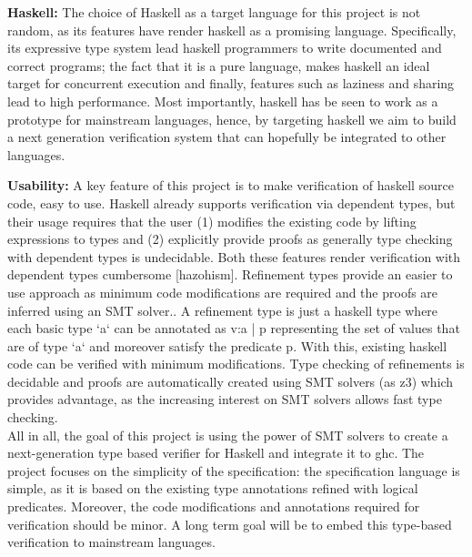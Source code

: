 \textbf{Haskell:}
The choice of Haskell as a target language for this project is not random, as its features have render haskell as a promising language.
Specifically, its expressive type system lead haskell programmers to write documented and  correct programs; the fact that it is a pure language, makes haskell an ideal target for concurrent execution and finally, features such as laziness and sharing lead to high performance. 
Most importantly, haskell has be seen to work as a prototype for mainstream languages,
hence, by targeting haskell we aim to build a next generation verification system that can hopefully be integrated to other languages.



\textbf{Usability:}
A key feature of this project is to make verification of haskell source code, easy to use.
Haskell already supports verification via dependent types, but their usage requires that the user
(1) modifies the existing code by lifting expressions to types
and (2) explicitly provide proofs as generally type checking with dependent types is undecidable.
Both these features render verification with dependent types cumbersome [hazohism].
%
Refinement types provide an easier to use approach as minimum code modifications are required 
and the proofs are inferred using an SMT solver..
%
A refinement type is just a haskell type where each basic type `a` can be annotated as 
{v:a | p} representing the set of values that are of type `a` and moreover satisfy the predicate p.
With this, existing haskell code can be verified with minimum modifications.
% 
Type checking of refinements is decidable and proofs are automatically created using SMT solvers (as z3) which provides advantage, as the increasing interest on SMT solvers allows fast type checking.
\\

All in all, the goal of this project is using the power of SMT solvers to 
create a next-generation type based verifier for Haskell and integrate it to ghc.
The project focuses on the simplicity of the specification:
the specification language is simple, as it is based on the existing type annotations
refined with logical predicates.
Moreover, the code modifications and annotations required for verification should be minor.
A long term goal will be to embed this type-based verification to mainstream languages.




